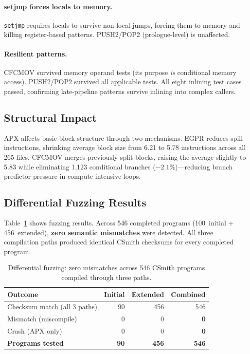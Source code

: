 \documentclass[acmsmall,nonacm]{acmart}
\begin{document}
\paragraph{setjmp forces locals to memory.}
\texttt{setjmp} requires locals to survive non-local jumps, forcing
them to memory and killing register-based patterns. PUSH2/POP2
(prologue-level) is unaffected.

\paragraph{Resilient patterns.}
CFCMOV survived memory operand tests (its purpose \emph{is}
conditional memory access). PUSH2/POP2 survived all applicable tests.
All eight inlining test cases passed, confirming late-pipeline patterns
survive inlining into complex callers.

\subsection{Structural Impact}

APX affects basic block structure through two mechanisms. EGPR reduces
spill instructions, shrinking average block size from 6.21 to 5.78
instructions across all 265 files. CFCMOV merges previously split
blocks, raising the average slightly to 5.83 while eliminating 1,123
conditional branches ($-2.1$\%)---reducing branch predictor pressure
in compute-intensive loops.

\subsection{Differential Fuzzing Results}

Table~\ref{tab:fuzzing} shows fuzzing results. Across 546 completed
programs (100~initial + 456~extended), \textbf{zero semantic
mismatches} were detected. All three compilation paths produced
identical CSmith checksums for every completed program.

\begin{table}[t]
  \caption{Differential fuzzing: zero mismatches across 546 CSmith
    programs compiled through three paths.}
  \label{tab:fuzzing}
  \footnotesize
  \begin{tabular}{lrrr}
    \toprule
    Outcome & Initial & Extended & Combined \\
    \midrule
    Checksum match (all 3 paths) & 90  & 456 & 546 \\
    Mismatch (miscompile) & 0 & 0 & \textbf{0} \\
    Crash (APX only) & 0 & 0 & \textbf{0} \\
    \midrule
    \textbf{Programs tested} & \textbf{90} & \textbf{456} & \textbf{546} \\
    \bottomrule
  \end{tabular}
\end{table}
\end{document}
